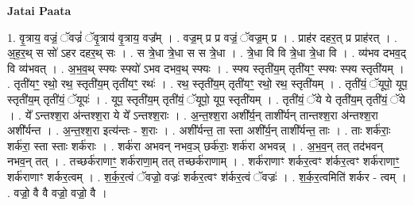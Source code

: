 \documentclass[17pt]{extarticle}
\begin{document}
\textbf{Jatai Paata} \newline

1. वृ॒त्राय॒ वज्रं॒ ॅवज्रं॑ ॅवृ॒त्राय॑ वृ॒त्राय॒ वज्र᳚म् । . वज्र॒म् प्र प्र वज्रं॒ ॅवज्र॒म् प्र । . प्राह॑र दहर॒त् प्र प्राह॑रत् । . अ॒ह॒र॒थ् स सो॑ ऽहर दहर॒थ् सः । . स त्रे॒धा त्रे॒धा स स त्रे॒धा । . त्रे॒धा वि वि त्रे॒धा त्रे॒धा वि । . व्य॑भव दभव॒द् वि व्य॑भवत् । . अ॒भ॒व॒थ् स्फ्यः स्फ्यो॑ ऽभव दभव॒थ् स्फ्यः । . स्फ्य स्तृती॑य॒म् तृती॑यꣳ॒॒ स्फ्यः स्फ्य स्तृती॑यम् । . तृती॑यꣳ॒॒ रथो॒ रथ॒ स्तृती॑य॒म् तृती॑यꣳ॒॒ रथः॑ । . रथ॒ स्तृती॑य॒म् तृती॑यꣳ॒॒ रथो॒ रथ॒ स्तृती॑यम् । . तृती॑यं॒ ॅयूपो॒ यूप॒ स्तृती॑य॒म् तृती॑यं॒ ॅयूपः॑ । . यूप॒ स्तृती॑य॒म् तृती॑यं॒ ॅयूपो॒ यूप॒ स्तृती॑यम् । . तृती॑यं॒ ॅये ये तृती॑य॒म् तृती॑यं॒ ॅये । . ये᳚ ऽन्तश्श॒रा अ॑न्तश्श॒रा ये ये᳚ ऽन्तश्श॒राः । . अ॒न्त॒श्श॒रा अशी᳚र्य॒न् ताशी᳚र्यन् तान्तश्श॒रा अ॑न्तश्श॒रा अशी᳚र्यन्त । . अ॒न्त॒श्श॒रा इत्य॑न्तः - श॒राः । . अशी᳚र्यन्त॒ ता स्ता अशी᳚र्य॒न् ताशी᳚र्यन्त॒ ताः । . ताः शर्क॑राः॒ शर्क॑रा॒ स्ता स्ताः शर्क॑राः । . शर्क॑रा अभवन् नभव॒ञ् छर्क॑राः॒ शर्क॑रा अभवन्न् । . अ॒भ॒व॒न् तत् तद॑भवन् नभव॒न् तत् । . तच्छर्क॑राणाꣳ॒॒ शर्क॑राणा॒म् तत् तच्छर्क॑राणाम् । . शर्क॑राणाꣳ शर्कर॒त्वꣳ श॑र्कर॒त्वꣳ शर्क॑राणाꣳ॒॒ शर्क॑राणाꣳ शर्कर॒त्वम् । . श॒र्क॒र॒त्वं ॅवज्रो॒ वज्रः॑ शर्कर॒त्वꣳ श॑र्कर॒त्वं ॅवज्रः॑ । . श॒र्क॒र॒त्वमिति॑ शर्कर - त्वम् । . वज्रो॒ वै वै वज्रो॒ वज्रो॒ वै । \newline
\end{document}
